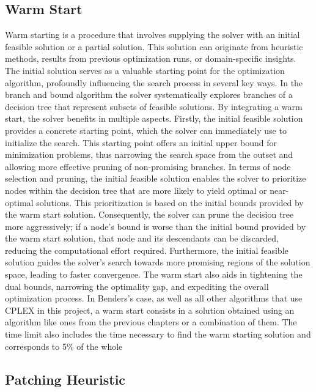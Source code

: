 \subsection{Warm Start}

Warm starting is a procedure that involves supplying the solver with an initial feasible solution or a partial solution.
This solution can originate from heuristic methods, results from previous optimization runs, or domain-specific insights.
The initial solution serves as a valuable starting point for the optimization algorithm, profoundly influencing the search process in several key ways.
In the branch and bound algorithm the solver systematically explores branches of a decision tree that represent subsets of feasible solutions.
By integrating a warm start, the solver benefits in multiple aspects. Firstly, the initial feasible solution provides a concrete starting point, which the solver can immediately use to initialize the search.
This starting point offers an initial upper bound for minimization problems, thus narrowing the search space from the outset and allowing more effective pruning of non-promising branches.
In terms of node selection and pruning, the initial feasible solution enables the solver to prioritize nodes within the decision tree that are more likely to yield optimal or near-optimal solutions.
This prioritization is based on the initial bounds provided by the warm start solution.
Consequently, the solver can prune the decision tree more aggressively; if a node's bound is worse than the initial bound provided by the warm start solution, that node and its descendants can be discarded, reducing the computational effort required.
Furthermore, the initial feasible solution guides the solver's search towards more promising regions of the solution space, leading to faster convergence.
The warm start also aids in tightening the dual bounds, narrowing the optimality gap, and expediting the overall optimization process.
In Benders's case, as well as all other algorithms that use CPLEX in this project, a warm start consists in a solution obtained using an algorithm like ones from the previous chapters or a combination of them.
The time limit also includes the time necessary to find the warm starting solution and corresponds to 5\% of the whole


\subsection{Patching Heuristic}

